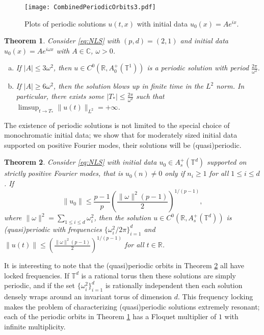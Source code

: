 \documentclass{article}
\newtheorem{theorem}{Theorem}[section]
\newcommand{\R}{\mathbb{R}}
\newcommand{\C}{\mathbb{C}}
\newcommand{\T}{\mathbb{T}}
\begin{document}
 \begin{figure}[t!]
 	\centering
 	\texttt{[image: CombinedPeriodicOrbits3.pdf]} 
 		\caption{Plots of periodic solutions $u(t,x)$ with initial data $u_0(x) = A e^{i x}$.  
 	}
 	\label{fig:Solutions}
 \end{figure}
 
 
 
\begin{theorem} \label{prop:Intro_Blowup}
	Consider   \eqref{eq:NLS}  with $(p,d)=(2,1)$ and  	   initial data $u_0(x) =   A e^{ i \omega  x}$ with  $A \in \C$,  $ \omega >0$.   
	\begin{enumerate}[(a)]
		\item If $|A| \leq  3  \omega^2$, then  $u \in C^0( \R , A_0^+(\T^1))$ is a periodic solution with period $\frac{2 \pi}{\omega^2}$. 
		\item If $|A| \geq  6\omega^2$,  then the solution blows up in finite time in the $L^2$ norm. In particular, there exists some  $|T_*| \leq  \frac{2 \pi}{\omega^2}$ such that  $\limsup_{t \to T_*} \| u(t)\|_{L^2} = + \infty$.   
	\end{enumerate}
\end{theorem}
  
  
  


 

The existence of periodic solutions is not limited to the special choice of monochromatic initial data; 
we show that for moderately sized initial data supported on positive Fourier modes, their solutions will be (quasi)periodic. 
\begin{theorem}
	\label{prop:Intro_Quasiperiodic}
	Consider \eqref{eq:NLS}   
	with initial data $u_0 \in A_s^+(\T^d)$ supported on strictly positive Fourier modes,  that is $ \hat{u}_0(n) \neq 0 $ only if $ n_{i} \geq 1 $ for all  $ 1 \leq i \leq d$.  If  
	\[
	\|u_0 \|  \leq    \frac{p-1}{p} \left( \frac{\|\omega\|^2 (p-1)}{2}\right)^{1/(p-1)},
	\]
	where $\|\omega\|^2  = \sum_{1 \leq i \leq d} \omega_i^2$, 
	then the solution $u \in C^0(\R, A_s^+(\T^d))$ is (quasi)periodic with  frequencies $\{ \omega_i^2 / 2 \pi  \}_{i=1}^d$ and $\| u(t) \| \leq  \left( \frac{\|\omega\|^2 (p-1)}{2}\right)^{1/(p-1)}$ for all $ t\in \R$.   
\end{theorem}









It is interesting to note that the (quasi)periodic orbits in Theorem \ref{prop:Intro_Quasiperiodic} all have locked frequencies. 
If $\T^d$ is a rational torus then these solutions are simply periodic, and if the set  $\{\omega_i^2\}_{i=1}^d$ is rationally independent then each solution densely wraps around an invariant torus of dimension $d$. 
This frequency locking makes the problem of characterizing (quasi)periodic solutions extremely resonant; each of the periodic orbits in Theorem \ref{prop:Intro_Blowup} has a Floquet multiplier of $1$ with infinite multiplicity. 
\end{document}
